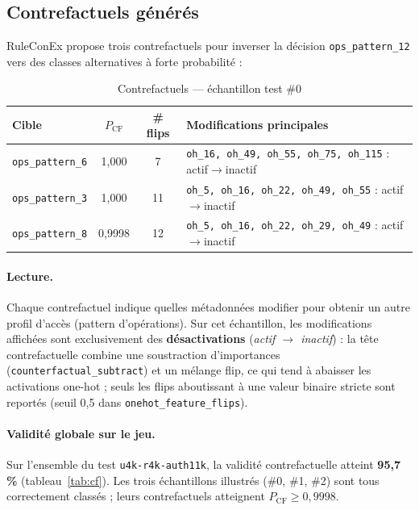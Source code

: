\documentclass[11pt,a4paper]{article}
\begin{document}
\subsection{Contrefactuels générés}

RuleConEx propose trois contrefactuels pour inverser la décision \texttt{ops\_pattern\_12} vers des classes alternatives à forte probabilité :

\begin{table}[h]
\centering
\caption{Contrefactuels — échantillon test \#0}
\small
\begin{tabular}{@{}lccp{5.5cm}@{}}
\toprule
\textbf{Cible} & \textbf{$P_{\mathrm{CF}}$} & \textbf{\# flips} & \textbf{Modifications principales} \\
\midrule
\texttt{ops\_pattern\_6} & 1,000 & 7 & \texttt{oh\_16, oh\_49, oh\_55, oh\_75, oh\_115} : actif$\to$inactif \\
\texttt{ops\_pattern\_3} & 1,000 & 11 & \texttt{oh\_5, oh\_16, oh\_22, oh\_49, oh\_55} : actif$\to$inactif \\
\texttt{ops\_pattern\_8} & 0,9998 & 12 & \texttt{oh\_5, oh\_16, oh\_22, oh\_29, oh\_49} : actif$\to$inactif \\
\bottomrule
\end{tabular}
\end{table}

\paragraph{Lecture.}
Chaque contrefactuel indique quelles métadonnées modifier pour obtenir un autre profil d'accès (pattern d'opérations). Sur cet échantillon, les modifications affichées sont exclusivement des \textbf{désactivations} (\emph{actif $\to$ inactif}) : la tête contrefactuelle combine une soustraction d'importances (\texttt{counterfactual\_subtract}) et un mélange flip, ce qui tend à abaisser les activations one-hot ; seuls les flips aboutissant à une valeur binaire stricte sont reportés (seuil 0,5 dans \texttt{onehot\_feature\_flips}).

\paragraph{Validité globale sur le jeu.}
Sur l'ensemble du test \texttt{u4k-r4k-auth11k}, la validité contrefactuelle atteint \textbf{95,7\,\%} (tableau~\ref{tab:cf}). Les trois échantillons illustrés (\#0, \#1, \#2) sont tous correctement classés ; leurs contrefactuels atteignent $P_{\mathrm{CF}} \geq 0{,}9998$.
\end{document}
